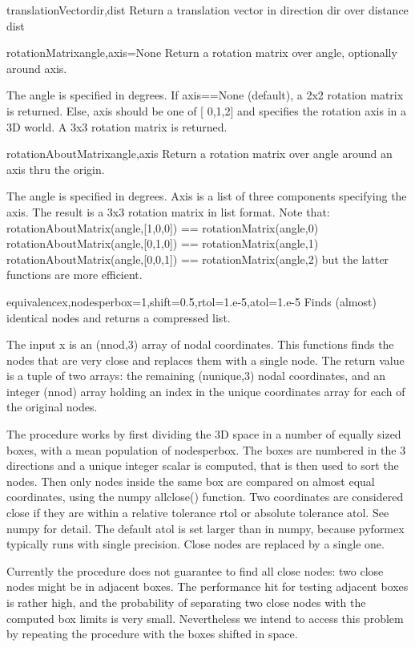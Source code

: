\begin{funcdesc}{translationVector}{dir,dist}
    Return a translation vector in direction dir over distance dist
\end{funcdesc}

\begin{funcdesc}{rotationMatrix}{angle,axis=None}
    Return a rotation matrix over angle, optionally around axis.

    The angle is specified in degrees.
    If axis==None (default), a 2x2 rotation matrix is returned.
    Else, axis should be one of [ 0,1,2] and specifies the rotation axis
    in a 3D world. A 3x3 rotation matrix is returned.
\end{funcdesc}
    

\begin{funcdesc}{rotationAboutMatrix}{angle,axis}
    Return a rotation matrix over angle around an axis thru the origin.

    The angle is specified in degrees.
    Axis is a list of three components specifying the axis.
    The result is a 3x3 rotation matrix in list format.
    Note that:
      rotationAboutMatrix(angle,[1,0,0]) == rotationMatrix(angle,0) 
      rotationAboutMatrix(angle,[0,1,0]) == rotationMatrix(angle,1) 
      rotationAboutMatrix(angle,[0,0,1]) == rotationMatrix(angle,2)
    but the latter functions are more efficient.
\end{funcdesc}
    


\begin{funcdesc}{equivalence}{x,nodesperbox=1,shift=0.5,rtol=1.e-5,atol=1.e-5}
    Finds (almost) identical nodes and returns a compressed list.

    The input x is an (nnod,3) array of nodal coordinates. This functions finds
    the nodes that are very close and replaces them with a single node.
    The return value is a tuple of two arrays: the remaining (nunique,3) nodal
    coordinates, and an integer (nnod) array holding an index in the unique
    coordinates array for each of the original nodes.

    The procedure works by first dividing the 3D space in a number of
    equally sized boxes, with a mean population of nodesperbox.
    The boxes are numbered in the 3 directions and a unique integer scalar
    is computed, that is then used to sort the nodes.
    Then only nodes inside the same box are compared on almost equal
    coordinates, using the numpy allclose() function. Two coordinates are
    considered close if they are within a relative tolerance rtol or absolute
    tolerance atol. See numpy for detail. The default atol is set larger than
    in numpy, because pyformex typically runs with single precision.
    Close nodes are replaced by a single one.

    Currently the procedure does not guarantee to find all close nodes:
    two close nodes might be in adjacent boxes. The performance hit for
    testing adjacent boxes is rather high, and the probability of separating
    two close nodes with the computed box limits is very small. Nevertheless
    we intend to access this problem by repeating the procedure with the
    boxes shifted in space.
\end{funcdesc}

